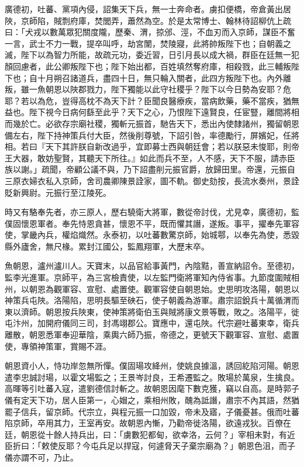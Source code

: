 \begin{pinyinscope}
 廣德初，吐蕃、黨項內侵，詔集天下兵，無一士奔命者。虜扣便橋，帝倉黃出居陜，京師陷，賊剽府庫，焚閭弄，蕭然為空。於是太常博士、翰林待詔柳伉上疏曰：「犬戎以數萬眾犯關度隴，歷秦、渭，掠邠、涇，不血刃而入京師，謀臣不奮一言，武士不力一戰，提卒叫呼，劫宮闈，焚陵寢，此將帥叛陛下也；自朝義之滅，陛下以為智力所能，故疏元功，委近習，日引月長以成大禍，群臣在廷無一犯顏回慮者，此公卿叛陛下也；陛下始出都，百姓填然奪府庫，相殺戮，此三輔叛陛下也；自十月朔召諸道兵，盡四十日，無只輪入關者，此四方叛陛下也。內外離叛，雖一魚朝恩以陜郡戮力，陛下獨能以此守社稷乎？陛下以今日勢為安耶？危耶？若以為危，豈得高枕不為天下計？臣聞良醫療疾，當病飲藥，藥不當疾，猶無益也。陛下視今日病何繇至此乎？天下之心，乃恨陛下遠賢良，任宦豎，離間將相而幾於亡。必欲存宗廟社稷，獨斬元振首，馳告天下，悉出內使隸諸州，獨留朝恩備左右，陛下持神策兵付大臣，然後削尊號，下詔引咎，率德勵行，屏嬪妃，任將相。若曰『天下其許朕自新改過乎，宜即募士西與朝廷會；若以朕惡未悛耶，則帝王大器，敢妨聖賢，其聽天下所往。』如此而兵不至，人不感，天下不服，請赤臣族以謝。」疏聞，帝顧公議不與，乃下詔盡削元振官爵，放歸田里。帝還，元振自三原衣婦衣私入京師，舍司農卿陳景詮家，圖不軌。御史劾按，長流水奏州，景詮貶新興尉。元振行至江陵死。



 時又有駱奉先者，亦三原人，歷右驍衛大將軍，數從帝討伐，尤見幸，廣德初，監僕固懷恩軍者。奉先恃恩貪甚，懷恩不平，既而懼其譖，遂叛。事平，擢奉先軍容使，掌畿內兵，權焰熾然。永泰初，以吐蕃數驚京師，始城鄠，以奉先為使，悉毀縣外廬舍，無尺椽。累封江國公，監鳳翔軍，大歷末卒。



 魚朝恩，瀘州瀘川人。天寶末，以品官給事黃門，內陰黠，善宣納詔令。至德初，監李光進軍。京師平，為三宮檢責使，以左監門衛將軍知內侍省事。九節度圍賊相州，以朝恩為觀軍容、宣慰、處置使。觀軍容使自朝恩始。史思明攻洛陽，朝恩以神策兵屯陜。洛陽陷，思明長驅至硤石，使子朝義為游軍。肅宗詔銳兵十萬循渭而東以濟師。朝恩按兵陜東，使神策將衛伯玉與賊將康文景等戰，敗之。洛陽平，徙屯汴州，加開府儀同三司，封馮翊郡公。寶應中，還屯陜。代宗避吐蕃東幸，衛兵離散，朝恩悉軍奉迎華陰，乘輿六師乃振，帝德之，更號天下觀軍容、宣慰、處置使，專領神策軍，賞賜不涯。



 朝恩資小人，恃功岸忽無所憚。僕固瑒攻絳州，使姚良據溫，誘回紇陷河陽。朝恩遣李忠誠討瑒，以霍文場監之；王景岑討良，王希遷監之。敗瑒於萬泉，生擒良。高暉等引吐蕃入寇，遣劉德信討斬之。故朝恩因麾下數克獲，竊以自高。是時郭子儀有定天下功，居人臣第一，心媢之，乘相州敗，醜為詆譖，肅宗不內其語，然猶罷子信兵，留京師。代宗立，與程元振一口加毀，帝未及寤，子儀憂甚。俄而吐蕃陷京師，卒用其力，王室再安。故朝恩內慚，乃勸帝徙洛陽，欲遠戎狄。百僚在廷，朝恩從十餘人持兵出，曰：「虜數犯都甸，欲幸洛，云何？」宰相未對，有近臣折曰：「敕使反耶？今屯兵足以捍寇，何遽脅天子棄宗廟為？」朝恩色沮，而子儀亦謂不可，乃止。




\end{pinyinscope}
